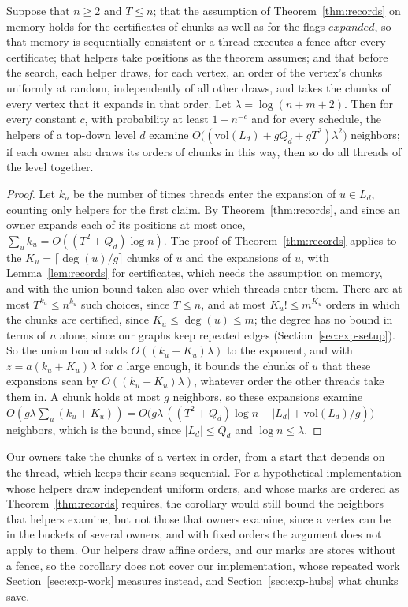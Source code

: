 \begin{corollary}
\label{cor:neighbors}
Suppose that $n \geq 2$ and $T \leq n$; that the assumption of Theorem~\ref{thm:records} on memory holds for the certificates of chunks as well as for the flags $\mathit{expanded}$, so that memory is sequentially consistent or a thread executes a fence after every certificate; that helpers take positions as the theorem assumes; and that before the search, each helper draws, for each vertex, an order of the vertex's chunks uniformly at random, independently of all other draws, and takes the chunks of every vertex that it expands in that order. Let $\lambda = \log(n + m + 2)$. Then for every constant $c$, with probability at least $1 - n^{-c}$ and for every schedule, the helpers of a top-down level $d$ examine $O\bigl((\mathrm{vol}(L_d) + g Q_d + g T^2)\lambda^2\bigr)$ neighbors; if each owner also draws its orders of chunks in this way, then so do all threads of the level together.
\end{corollary}
\begin{proof}
Let $k_u$ be the number of times threads enter the expansion of $u \in L_d$, counting only helpers for the first claim. By Theorem~\ref{thm:records}, and since an owner expands each of its positions at most once, $\sum_{u} k_u = O((T^2 + Q_d)\log n)$. The proof of Theorem~\ref{thm:records} applies to the $K_u = \lceil \deg(u)/g \rceil$ chunks of $u$ and the expansions of $u$, with Lemma~\ref{lem:records} for certificates, which needs the assumption on memory, and with the union bound taken also over which threads enter them. There are at most $T^{k_u} \leq n^{k_u}$ such choices, since $T \leq n$, and at most $K_u! \leq m^{K_u}$ orders in which the chunks are certified, since $K_u \leq \deg(u) \leq m$; the degree has no bound in terms of $n$ alone, since our graphs keep repeated edges (Section~\ref{sec:exp-setup}). So the union bound adds $O((k_u + K_u)\lambda)$ to the exponent, and with $z = a(k_u + K_u)\lambda$ for $a$ large enough, it bounds the chunks of $u$ that these expansions scan by $O((k_u + K_u)\lambda)$, whatever order the other threads take them in. A chunk holds at most $g$ neighbors, so these expansions examine $O(g\lambda \sum_u (k_u + K_u)) = O\bigl(g\lambda\,((T^2 + Q_d)\log n + |L_d| + \mathrm{vol}(L_d)/g)\bigr)$ neighbors, which is the bound, since $|L_d| \leq Q_d$ and $\log n \leq \lambda$.
\end{proof}

Our owners take the chunks of a vertex in order, from a start that depends on the thread, which keeps their scans sequential. For a hypothetical implementation whose helpers draw independent uniform orders, and whose marks are ordered as Theorem~\ref{thm:records} requires, the corollary would still bound the neighbors that helpers examine, but not those that owners examine, since a vertex can be in the buckets of several owners, and with fixed orders the argument does not apply to them. Our helpers draw affine orders, and our marks are stores without a fence, so the corollary does not cover our implementation, whose repeated work Section~\ref{sec:exp-work} measures instead, and Section~\ref{sec:exp-hubs} what chunks save.
